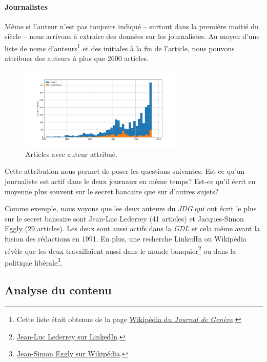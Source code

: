 \documentclass[a4paper, 11pt]{article}
\begin{document}
\newpage

\hypertarget{journalistes}{%
\paragraph{Journalistes}\label{journalistes}}

Même si l'auteur n'est pas toujours indiqué -- surtout dans la première
moitié du siècle -- nous arrivons à extraire des données sur les
journalistes. Au moyen d'une liste de noms d'auteurs\footnote{Cette
  liste était obtenue de la page
  \href{https://fr.wikipedia.org/wiki/Journal_de_Gen\%C3\%A8ve}{Wikipédia
  du \emph{Journal de Genève}}.} et des initiales à la fin de l'article,
nous pouvons attribuer des auteurs à plus que 2600 articles.

\begin{figure}
\centering
\includegraphics[width=0.7\textwidth]{methodology/author_attributed.png}
\caption{Articles avec auteur attribué.}
\end{figure}

Cette attribution nous permet de poser les questions suivantes: Est-ce
qu'un journaliste est actif dans le deux journaux en même temps? Est-ce
qu'il écrit en moyenne plus souvent sur le secret bancaire que sur
d'autres sujets?

Comme exemple, nous voyons que les deux auteurs du \emph{JDG} qui ont
écrit le plus sur le secret bancaire sont Jean-Luc Lederrey (41
articles) et Jacques-Simon Eggly (29 articles). Les deux sont aussi
actifs dans la \emph{GDL} et cela même avant la fusion des rédactions en
1991. En plus, une recherche LinkedIn ou Wikipédia révèle que les deux
travaillaient aussi dans le monde banquier\footnote{\href{https://ch.linkedin.com/in/lederrey-jean-luc-1456b717}{Jean-Luc
  Lederrey sur LinkedIn}.} ou dans la politique libérale\footnote{\href{https://fr.wikipedia.org/wiki/Jacques-Simon_Eggly}{Jean-Simon
  Eggly sur Wikipédia}.}.

\hypertarget{analyse-du-contenu}{%
\subsection{Analyse du contenu}\label{analyse-du-contenu}}
\end{document}
